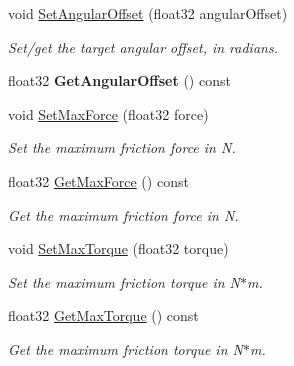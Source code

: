 \begin{DoxyCompactItemize}
void \hyperlink{classb2MotorJoint_a14d7dca1767548ddffe293e39cafc3c7}{Set\+Angular\+Offset} (float32 angular\+Offset)
\begin{DoxyCompactList}\small\item\em Set/get the target angular offset, in radians. \end{DoxyCompactList}\item 
\mbox{\label{classb2MotorJoint_a4dc4e5ee4ec8615c3d712ea6cac48436}} 
float32 {\bfseries Get\+Angular\+Offset} () const
\item 
\mbox{\label{classb2MotorJoint_a62f95f23d60123cebe14f2fcec155801}} 
void \hyperlink{classb2MotorJoint_a62f95f23d60123cebe14f2fcec155801}{Set\+Max\+Force} (float32 force)
\begin{DoxyCompactList}\small\item\em Set the maximum friction force in N. \end{DoxyCompactList}\item 
\mbox{\label{classb2MotorJoint_ac7353eace38d2593a523149abe8ec2b5}} 
float32 \hyperlink{classb2MotorJoint_ac7353eace38d2593a523149abe8ec2b5}{Get\+Max\+Force} () const
\begin{DoxyCompactList}\small\item\em Get the maximum friction force in N. \end{DoxyCompactList}\item 
\mbox{\label{classb2MotorJoint_a3e9a259d36c36e0dc078282e6799d625}} 
void \hyperlink{classb2MotorJoint_a3e9a259d36c36e0dc078282e6799d625}{Set\+Max\+Torque} (float32 torque)
\begin{DoxyCompactList}\small\item\em Set the maximum friction torque in N$\ast$m. \end{DoxyCompactList}\item 
\mbox{\label{classb2MotorJoint_a40d4e4e852a6a722708f0c47b5c9fd69}} 
float32 \hyperlink{classb2MotorJoint_a40d4e4e852a6a722708f0c47b5c9fd69}{Get\+Max\+Torque} () const
\begin{DoxyCompactList}\small\item\em Get the maximum friction torque in N$\ast$m. \end{DoxyCompactList}\item 

\end{DoxyCompactItemize}
